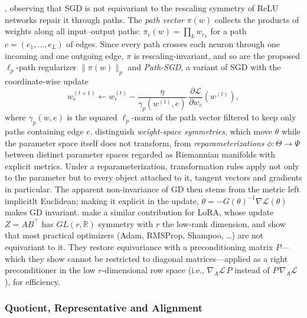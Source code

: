 \documentclass[mathematics,review,submit,moreauthors]{Definitions/mdpi}
\begin{document}
\citet{neyshabur2015anips}, observing that SGD is not equivariant to the rescaling symmetry of ReLU networks repair it through paths.
The \emph{path vector} $\pi(w)$ collects the products of weights along all input--output paths: $\pi_c(w)=\prod_{k}w_{e_k}$ for a path $c=(e_1,\dots,e_L)$ of edges.
Since every path crosses each neuron through one incoming and one outgoing edge, $\pi$ is rescaling-invariant, and so are the proposed $\ell_p$-path regularizer $\lVert\pi(w)\rVert_p$ and \emph{Path-SGD}, a variant of SGD with the coordinate-wise update
\begin{equation*}
    w_e^{(t+1)}\gets w_e^{(t)}-\frac{\eta}{\gamma_p(w^{(t)},e)}\,\frac{\partial\mathcal{L}}{\partial w_e}(w^{(t)}),
\end{equation*}
where $\gamma_p(w,e)$ is the squared $\ell_p$-norm of the path vector filtered to keep only paths containing edge $e$.
\citet{kristiadi2023anips} distinguish \emph{weight-space symmetries}, which move $\theta$ while the parameter space itself does not transform, from \emph{reparameterizations} $\phi:\Theta\to\Psi$ between distinct parameter spaces regarded as Riemannian manifolds with explicit metrics.
Under a reparameterization, transformation rules apply not only to the parameter but to every object attached to it, tangent vectors and gradients in particular.
The apparent non-invariance of GD then stems from the metric left implicitlt Euclidean; making it explicit in the update, $\dot{\theta}=-G(\theta)^{-1}\nabla\mathcal{L}(\theta)$ makes GD invariant.
\citet{yen2025iclr} make a similar contribution for LoRA, whose update $Z=AB^{\top}$ has $GL(r,\mathbb{R})$ symmetry with $r$ the low-rank dimension, and show that most practical optimizers (Adam, RMSProp, Shampoo, \dots) are not equivariant to it.
They restore equivariance with a preconditioning matrix $P$---which they show cannot be restricted to diagonal matrices---applied as a right preconditioner in the low $r$-dimensional row space (i.e., $\nabla_A\mathcal{L}\,P$ instead of $P\,\nabla_A\mathcal{L}$), for efficiency.

\subsubsection{Quotient, Representative and Alignment}\label{sec:quotient-repr-align}
\end{document}
